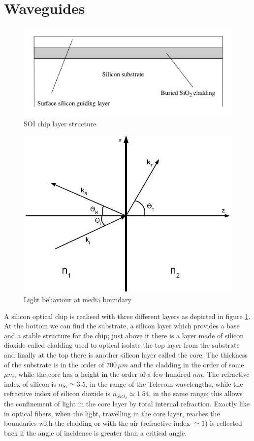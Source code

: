 \section{Waveguides}
\begin{figure}[ht]
\centering
\includegraphics[width = .7\textwidth]{img/SOIstructure}
\caption{SOI chip layer structure}
\label{SOIstructure}
\end{figure}
\begin{figure}[ht]
\centering
\includegraphics[width = .5\textwidth]{img/TIRDiagram3}
\caption{Light behaviour at media boundary}
\label{criticalangle}
\end{figure}
A silicon optical chip is realised with three different layers as depicted in figure \ref{SOIstructure}. At the bottom we can find the substrate, a silicon layer which provides a base and a stable structure for the chip; just above it there is a layer made of silicon dioxide called cladding used to optical isolate the top layer from the substrate and finally at the top there is another silicon layer called the core. The thickness of the substrate is in the order of $700\, \mu m $ and the cladding in the order of some $\mu m$, while the core has a height in the order of a few hundred $nm$. The refractive index of silicon is $n_{Si} \simeq 3.5$, in the range of the Telecom wavelengths, while the refractive index of silicon dioxide is $n_{SiO_2}\simeq 1.54$, in the same range; this allows the confinement of light in the core layer by total internal refraction. Exactly like in optical fibers, when the light, travelling in the core layer, reaches the boundaries with the cladding or with the air (refractive index $\simeq 1$) is reflected back if the angle of incidence is greater than a critical angle. 
